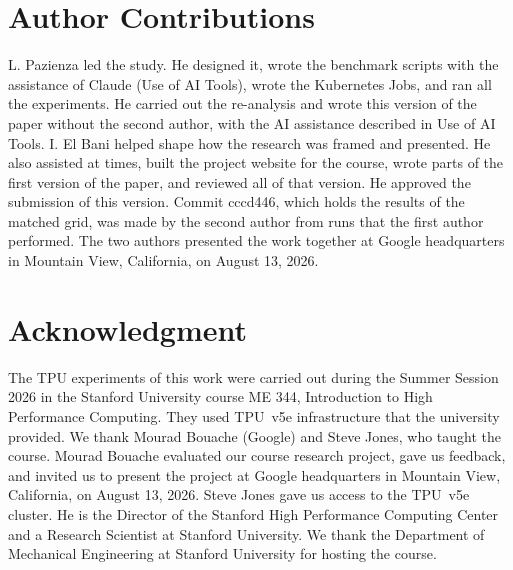 \section*{Author Contributions}
L. Pazienza led the study.
He designed it, wrote the benchmark scripts with the assistance of Claude (Use of AI Tools), wrote the Kubernetes Jobs, and ran all the experiments.
 He carried out the re-analysis and wrote this version of the paper without
the second author, with the AI assistance described in Use of AI Tools. I. El Bani helped shape how the research was
framed and presented. He also assisted at
times, built the project website for the course, wrote parts of the first version of the paper, and reviewed all of that
version. He approved the submission of this version.
Commit cccd446, which holds the results of the matched grid, was made by the second author from runs that the first author performed. %
The two authors presented the work together at Google headquarters in Mountain View, California, on August 13, 2026. %

\section*{Acknowledgment}
The TPU experiments of this work were carried out during the Summer Session 2026 in the Stanford University course ME 344, Introduction to High Performance Computing. %
They used TPU~v5e infrastructure that the university provided. We thank Mourad Bouache (Google) and Steve Jones, who taught the course.
Mourad Bouache evaluated our course research project, gave us feedback, and invited us to present the project at Google headquarters in Mountain View, California, on August 13, 2026. %
Steve Jones gave us access to the TPU~v5e cluster. He is the Director of the Stanford High Performance Computing Center
and a Research Scientist at Stanford University. We thank the Department of Mechanical Engineering at Stanford
University for hosting the course.
